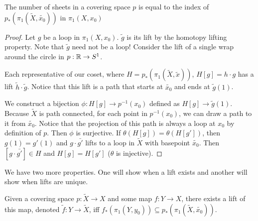 \documentclass[10pt]{article}
\begin{document}
\begin{proposition}
	The number of sheets in a covering space $p$ is equal to the index of
	$p_*(\pi_1(\tilde{X}, \tilde{x_0}))$ in $\pi_1(X, x_0)$
\end{proposition}

\begin{proof}
	Let $g$ be a loop in $\pi_1(X, x_0)$. $\tilde{g}$ is its lift by the homotopy
	lifting property. Note that $\tilde{g}$ need not be a loop! Consider the lift
	of a single wrap around the circle in $p: \mathbb{R} \to S^1$.

	Each representative of our coset, where $H = p_*(\pi_1(\tilde{X}, \tilde{x}))$,
	$H[g] = h\cdot g$ has a lift $\tilde{h}\cdot\tilde{g}$. Notice that this lift
	is a path that starts at $\tilde{x_0}$ and ends at $\tilde{g}(1)$.

	We construct a bijection $\phi: H[g] \to p^{-1}(x_0)$ defined as $H[g] \to
	\tilde{g}(1)$. Because $\tilde{X}$ is path connected, for each point in
	$p^{-1}(x_0)$, we can draw a path to it from $\tilde{x_0}$. Notice that the
	projection of this path is always a loop at $x_0$ by definition of $p$. Then
	$\phi$ is surjective. If $\theta(H[g]) = \theta(H[g'])$, then $g(1) = g'(1)$
	and $g \cdot \bar{g'}$ lifts to a loop in $\tilde{X}$ with basepoint
	$\tilde{x_0}$. Then $[g \cdot \bar{g'}] \in H$ and $H[g] = H[g']$ ($\theta$ is
	injective).
\end{proof}

We have two more properties. One will show when a lift exists and another will
show when lifts are unique.

\begin{proposition}
	Given a covering space $p: \tilde{X} \to X$ and some map $f: Y \to X$, there
	exists a lift of this map, denoted $\tilde{f}: Y \to \tilde{X}$, iff $f_*(\pi_1(Y, y_0)) \subseteq
	p_*(\pi_1(\tilde{X}, \tilde{x_0}))$.
\end{proposition}
\end{document}
